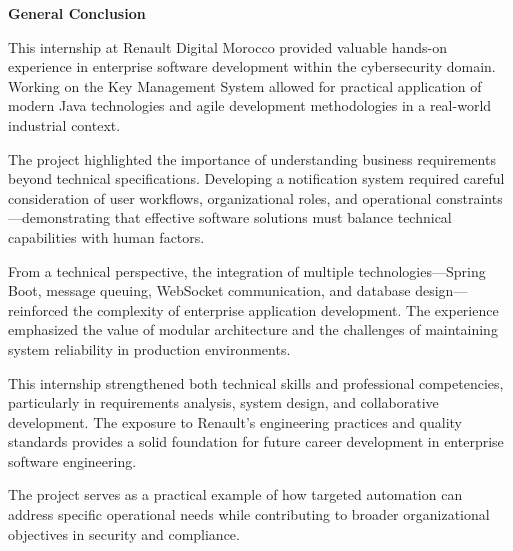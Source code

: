 \fancyhead{}

\vspace*{1cm}
\begin{center}
    \textbf{\huge{General Conclusion}}
\end{center}
\vspace{1cm}

\begin{doublespace}
This internship at Renault Digital Morocco provided valuable hands-on experience in enterprise software development within the cybersecurity domain. Working on the Key Management System allowed for practical application of modern Java technologies and agile development methodologies in a real-world industrial context.

The project highlighted the importance of understanding business requirements beyond technical specifications. Developing a notification system required careful consideration of user workflows, organizational roles, and operational constraints—demonstrating that effective software solutions must balance technical capabilities with human factors.

From a technical perspective, the integration of multiple technologies—Spring Boot, message queuing, WebSocket communication, and database design—reinforced the complexity of enterprise application development. The experience emphasized the value of modular architecture and the challenges of maintaining system reliability in production environments.

This internship strengthened both technical skills and professional competencies, particularly in requirements analysis, system design, and collaborative development. The exposure to Renault's engineering practices and quality standards provides a solid foundation for future career development in enterprise software engineering.

The project serves as a practical example of how targeted automation can address specific operational needs while contributing to broader organizational objectives in security and compliance.
\end{doublespace}